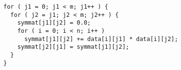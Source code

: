 \begin{lstlisting}[morekeywords={symmat}, belowskip=0pt]
for ( j1 = 0; j1 < m; j1++ ) {
  for ( j2 = j1; j2 < m; j2++ ) {
    symmat[j1][j2] = 0.0;
    for ( i = 0; i < n; i++ )
      symmat[j1][j2] += data[i][j1] * data[i][j2];
    symmat[j2][j1] = symmat[j1][j2];
  }
}
\end{lstlisting}
